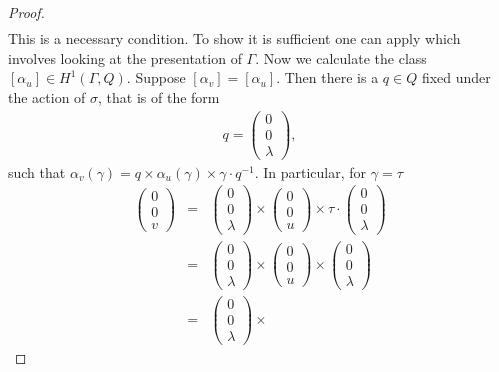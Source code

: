 \begin{proof}
\begin{eqnarray*}
	\end{eqnarray*}
	This is a necessary condition. To show it is sufficient one can apply \cite[Proposition 2]{martin2004nonab} which involves looking at the presentation of $\Gamma$.
	Now we calculate the class $[\alpha_u] \in H^1(\Gamma, Q)$. Suppose $[\alpha_v] = [\alpha_u]$. Then
	there is a $q\in Q$ fixed under the action of $\sigma$, that is of the form
	\begin{eqnarray*}
		q = \left(\begin{matrix} 0 \\ 0 \\ \lambda\end{matrix}\right),
	\end{eqnarray*}
	such that $\alpha_v(\gamma) = q\times\alpha_u(\gamma)\times\gamma\cdot q^{-1}$. In particular, for $\gamma = \tau$
	\begin{eqnarray*}
		\left(\begin{matrix} 0 \\ 0 \\ v\end{matrix}\right) &=&
		\left(\begin{matrix} 0 \\ 0 \\ \lambda\end{matrix}\right) \times
		\left(\begin{matrix} 0 \\ 0 \\ u\end{matrix}\right) \times
		\tau\cdot\left(\begin{matrix} 0 \\ 0 \\ \lambda\end{matrix}\right)\\
		&=&
		\left(\begin{matrix} 0 \\ 0 \\ \lambda\end{matrix}\right) \times
		\left(\begin{matrix} 0 \\ 0 \\ u\end{matrix}\right) \times
		\left(\begin{matrix} 0 \\ 0 \\ \lambda\end{matrix}\right)\\
		&=&
		\left(\begin{matrix} 0 \\ 0 \\ \lambda\end{matrix}\right) \times

\end{eqnarray*}
\end{proof}
